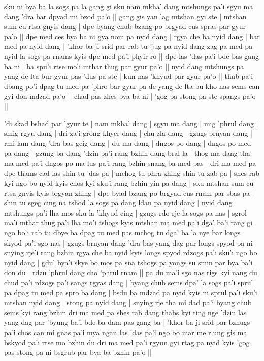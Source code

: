 \documentclass[11pt,twoside]{article}\makeatletter
\begin{document}
\par
\label{TV11.1}sku ni bya ba la sogs pa la gang gi sku nam mkha' dang mtshungs pa'i sgyu ma dang 'dra bar dpyad mi bzod pa'o || gang gis yan lag mtshan gyi ste | mtshan sum cu rtsa gnyis dang | dpe byang chub bzang po brgyad cus spras par gyur pa'o || dpe med ces bya ba ni gya nom pa nyid dang | rgya che ba nyid dang | bar med pa nyid dang | 'khor ba ji srid par rab tu 'jug pa nyid dang zag pa med pa nyid la sogs pa rnams kyis dpe med pa'i phyir ro || dpe las 'das pa'i bde bas gang ba ni | ba spu'i rtse mo'i mthar thug par gyur pa'o || nyid dang mtshungs pa yang de lta bur gyur pas 'dus pa ste | kun nas 'khyud par gyur pa'o || thub pa'i dbang po'i dpag tu med pa 'phro bar gyur pa de yang de lta bu kho nas sems can gyi don mdzad pa'o || chad pas zhes bya ba ni | 'gog pa stong pa ste spangs pa'o || \par
\label{TV11.2}'di skad bshad par 'gyur te | nam mkha' dang | sgyu ma dang | mig 'phrul dang | smig rgyu dang | dri za'i grong khyer dang | chu zla dang | gzugs brnyan dang | rmi lam dang 'dra bas gcig dang | du ma dang | dngos po dang | dngos po med pa dang | gzung ba dang 'dzin pa'i rang bzhin dang bral la | thog ma dang tha ma med pa'i dngos po ma lus pa'i rang bzhin snang ba med pas | dri ma med pa dpe thams cad las shin tu 'das pa | mchog tu phra zhing shin tu zab pa | shes rab kyi ngo bo nyid kyis chos kyi sku'i rang bzhin yin pa dang | sku mtshan sum cu rtsa gnyis kyis brgyan zhing | dpe byad bzang po brgyad cus rnam par sbas pa | shin tu sgeg cing na tshod la sogs pa dang ldan pa nyid dang | nyid dang mtshungs pa'i lha mos sku la 'khyud cing | gzugs rdo rje la sogs pa nas | sgrol ma'i mthar thug pa'i lha mo'i tshogs kyis mtshan ma med pa'i dga' ba'i rang gi ngo bo'i rab tu dbye ba dpag tu med pas mchog tu dga' ba la nye bar longs skyod pa'i sgo nas | gzugs brnyan dang 'dra bas yang dag par longs spyod pa ni snying rje'i rang bzhin rgya che ba nyid kyis longs spyod rdzogs pa'i sku'i ngo bo nyid dang | gdul bya'i skye bo mos pa sna tshogs pa yongs su smin par bya ba'i don du | rdzu 'phrul dang cho 'phrul rnam  || pa du ma'i sgo nas rigs kyi nang du chud pa'i rdzogs pa'i sangs rgyas dang | byang chub sems dpa' la sogs pa'i sprul pa dpag tu med pa spro ba dang | bsdu ba mdzad pa nyid kyis ni sprul pa'i sku'i mtshan nyid dang | stong pa nyid dang | snying rje tha mi dad pa'i byang chub sems kyi rang bzhin dri ma med pa shes rab dang thabs kyi ting nge 'dzin las yang dag par 'byung ba'i bde ba dam pas gang ba | 'khor ba ji srid par bzhugs pa'i chos can mi gnas pa'i mya ngan las 'das pa'i ngo bo mar me rlung gis ma bskyod pa'i rtse mo bzhin du dri ma med pa'i rgyun gyi rtag pa nyid kyis 'gog pas stong pa ni bsgrub par bya ba bzhin pa'o ||
\end{document}
